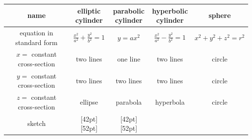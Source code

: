 \vfill
\noindent
\renewcommand{\arraystretch}{1.5}
\begin{tabular}{ | c | c | c | c | c |}
  \hline
  name & \parbox[c]{1.8cm}{\smallskip elliptic\\cylinder}
       & \parbox[c]{1.8cm}{\smallskip parabolic\\cylinder} 
       & \parbox[c]{1.8cm}{\smallskip hyperbolic\\cylinder} 
       & sphere \\[0.1in]
  \hline
  \parbox[c]{2.75cm}{\smallskip equation in\\standard form} 
             & $\frac{x^2}{a^2}+\frac{y^2}{b^2}=1$
             & $y=ax^2$ 
             & $\frac{x^2}{a^2}-\frac{y^2}{b^2}=1$
             & $x^2+y^2+z^2=r^2$\\[0.1in]
  \hline
  \parbox[c]{2.75cm}{\smallskip $x=$ constant \\cross-section} 
            & two lines 
            & one line 
            & two lines 
            & circle \\[0.1in]
  \hline
  \parbox[c]{2.75cm}{\smallskip $y=$ constant \\cross-section} 
            & two lines
            & two lines
            & two lines 
            & circle \\[0.1in]
  \hline
  \parbox[c]{2.75cm}{\smallskip $z=$ constant \\cross-section} 
            & ellipse
            & parabola 
            & hyperbola 
            & circle \\[0.1in]
  \hline
  sketch 
     & \raisebox{-45pt}[42pt][52pt]
              {  }
     & \raisebox{-47pt}[42pt][52pt]
             {}

\end{tabular}
